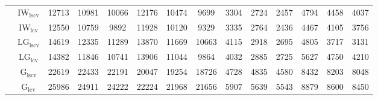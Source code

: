 \begin{table}[!ht]
{\begin{tabular}{@{}cc|ccc|ccc|ccc|ccc@{}}
 & $\mathrm{IW}_{\mathrm{lscv}}$ & \cellcolor{black!10}12713 & \cellcolor{black!10}10981 & \cellcolor{black!10}10066 & \cellcolor{black!10}12176 & \cellcolor{black!10}10474 & \cellcolor{black!10}9699 & 3304 & 2724 & 2457 & 4794 & 4458 & 4037 \\ 
 & $\mathrm{IW}_{\mathrm{lcv}}$ & \cellcolor{black!30}12550 & \cellcolor{black!30}10759 & \cellcolor{black!30}9892 & \cellcolor{black!30}11928 & \cellcolor{black!30}10120 & \cellcolor{black!30}9329 & 3335 & 2764 & 2436 & 4467 & 4105 & 3756 \\ 
 & $\mathrm{LG}_{\mathrm{lscv}}$ & 14619 & 12335 & 11289 & 13870 & 11669 & 10663 & 4115 & 2918 & 2695 & 4805 & 3717 & 3131 \\ 
 & $\mathrm{LG}_{\mathrm{lcv}}$ & 14382 & 11846 & 10741 & 13906 & 11044 & 9864 & 4032 & 2885 & 2725 & 5627 & 4750 & 4210 \\ 
 & $\mathrm{G}_{\mathrm{lscv}}$ & 22619 & 22433 & 22191 & 20047 & 19254 & 18726 & 4728 & 4835 & 4580 & 8432 & 8203 & 8048 \\ 
 & $\mathrm{G}_{\mathrm{lcv}}$ & 25986 & 24911 & 24222 & 22224 & 21968 & 21656 & 5907 & 5639 & 5543 & 8879 & 8600 & 8450 \\ 
\bottomrule
\end{tabular}}
\end{table}
